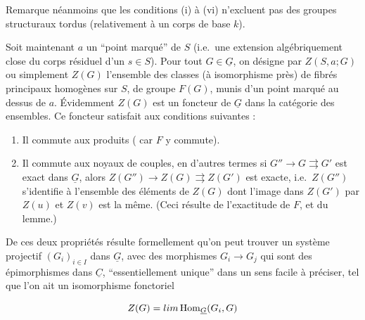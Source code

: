 \documentclass[11pt,a4paper]{article}
\begin{document}
Remarque néanmoins que les conditions (i) à (vi) n'excluent pas des groupes
structuraux tordus (relativement à un corps de base $k$).

Soit maintenant $a$ un ``point marqué'' de $S$ (i.e.\ une extension
algébriquement close du corps résiduel d'un $s \in S$). Pour tout $G \in
\underline{G}$, on désigne par $Z(S, a ; G)$ ou simplement $Z(G)$ l'ensemble
des classes (à isomorphisme près) de fibrés principaux homogènes sur $S$, de
groupe $F(G)$, munis d'un point marqué au dessus de $a$. Évidemment $Z(G)$ est
un foncteur de $\underline{G}$ dans la catégorie des ensembles. Ce foncteur
satisfait aux conditions suivantes :

\begin{enumerate}
\item[1)] Il commute aux produits ( car $F$ y commute).
\item[2)] Il commute aux noyaux de couples, en d'autres termes si $G'' \to G
\rightrightarrows G'$ est exact dans $\underline{G}$, alors $Z(G'') \to Z(G)
\rightrightarrows Z(G')$ est exacte, i.e.\ $Z(G'')$ s'identifie à l'ensemble
des éléments de $Z(G)$ dont l'image dans $Z(G')$ par $Z(u)$ et $Z(v)$ est la
même. (Ceci résulte de l'exactitude de $F$, et du lemme.)
\end{enumerate}


De ces deux propriétés résulte formellement qu'on peut trouver un système
projectif  $(G_{i})_{i \in I}$ dans $\underline{G}$, avec des
morphismes $G_{i} \to G_{j}$ qui sont des épimorphismes dans $\underline{C}$,
``essentiellement unique'' dans un sens facile à préciser, tel que
\struck{\ill{}} l'on ait un isomorphisme fonctoriel

\[ Z(G) = \varinjlim \operatorname{Hom}_{\underline{G}}(G_{i}, G) \]
\end{document}
